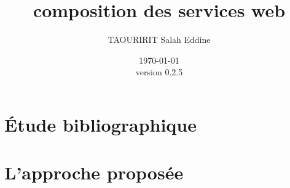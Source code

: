 \documentclass[a4paper, oneside, 12pt]{report}
\author{TAOURIRIT Salah Eddine}
\title{composition des services web}
\date{\today\\version 0.2.5}
\begin{document}
\let\Item\item \newcommand{\head}[1]{\textnormal{\textbf{#1}}}
\newcommand\SpecialItem{\renewcommand\item[1][]{\Item[\textbullet~\sffamily ##1]}}
\newcommand\SpecialItemi{\renewcommand\item[1][]{\Item[\textendash~\sffamily ##1]}}
\renewcommand{\descriptionlabel}[1]{\hspace{1cm}\textbullet~\textsf{#1}}
\renewcommand\enddescription{\endlist\global\let\item\Item}
\newtheorem{mydef}{Definition}

\maketitle 

\setcounter{secnumdepth}{4}
\setcounter{tocdepth}{4}

\setcounter{tocdepth}{3}
\tableofcontents

\listoffigures
\listoftables


\part{Étude bibliographique}




\part{L'approche proposée}





\end{document}
